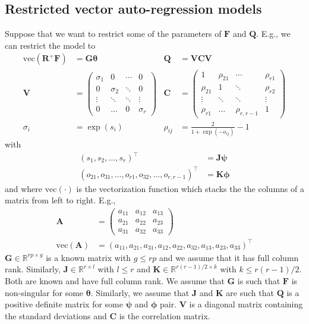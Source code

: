\documentclass[notitlepage]{article}
\renewcommand{\vec}[1]{\bm{#1}}
\newcommand{\mat}[1]{\mathbf{#1}}
\newcommand{\Lparen}[1]{\left( #1\right)}
\newcommand{\optor}[2]{#1\Lparen{#2}}
\newcommand{\vecOP}[1]{\optor{\text{vec}}{#1}}
\newcommand{\dimState}{p}
\newcommand{\dimRng}{r}
\begin{document}
\subsection{Restricted vector auto-regression models}
Suppose that we want to restrict some of the parameters of $\mat{F}$ and $\mat{Q}$. E.g., we can restrict the model to %
%
\begin{align*}
\vecOP{\mat{R}^+\mat{F}} &= \mat{G}\vec{\theta} &  
  \mat{Q} &= \mat{V}\mat{C}\mat{V} \\
\mat{V} &= \begin{pmatrix} 
     \sigma_1 & 0 & \cdots & 0 \\
     0 & \sigma_2 & \ddots & 0 \\
     \vdots & \ddots & \ddots & \vdots \\
     0 & \dots & 0 & \sigma_\dimRng
   \end{pmatrix} &
  \mat{C} &= \begin{pmatrix} 
     1 & \rho_{21} & \cdots & \rho_{\dimRng1} \\
     \rho_{21} & 1 & \ddots & \rho_{\dimRng2} \\
     \vdots & \ddots & \ddots & \vdots \\
     \rho_{\dimRng1} & \dots & \rho_{\dimRng,\dimRng-1} & 1
   \end{pmatrix} \\
\sigma_i &= \exp(s_i) & 
  \rho_{ij}&= \frac{2}{1 + \exp(-o_{ij})} - 1
\end{align*}%
%
with%
%
\begin{align*}
  (s_1,s_2,\dots, s_\dimRng)^\top&=\mat{J}\vec\psi \\
  (o_{21},o_{31},\dots,o_{\dimRng1},o_{32},\dots,o_{\dimRng,\dimRng-1})^\top&=\mat{K}\vec\phi  
\end{align*} %
%
and where $\vecOP{\cdot}$ is the vectorization function which stacks the the columns of a matrix from left to right. E.g., %
%
\begin{align*}
\mat{A} &= \begin{pmatrix}
	a_{11} & a_{12} & a_{13} \\
	a_{21} & a_{22} & a_{23} \\
	a_{31} & a_{32} & a_{33}
\end{pmatrix} \\
\vecOP{\mat{A}} &= \Lparen{
	a_{11}, a_{21}, a_{31}, 
	a_{12}, a_{22}, a_{32},
	a_{13}, a_{23}, a_{33}}^\top
\end{align*}
%
$\mat{G}\in\mathbb{R}^{\dimRng\dimState \times g}$ is a known matrix with $g \leq \dimRng\dimState$ and we assume that it has full column rank. Similarly, $\mat{J}\in\mathbb{R}^{\dimRng \times l}$ with $l \leq \dimRng$ and $\mat{K}\in\mathbb{R}^{\dimRng(\dimRng - 1)/2 \times k}$ with $k\leq \dimRng(\dimRng - 1)/2$. Both are known and have full column rank. We assume that $\mat{G}$ is such that $\mat{F}$ is non-singular for some $\vec{\theta}$. Similarly, we assume that $\mat{J}$ and $\mat{K}$ are such that $\mat{Q}$ is a positive definite matrix for some $\vec{\psi}$ and $\vec{\phi}$ pair. $\mat{V}$ is a diagonal matrix containing the standard deviations and $\mat{C}$ is the correlation matrix.
\end{document}

